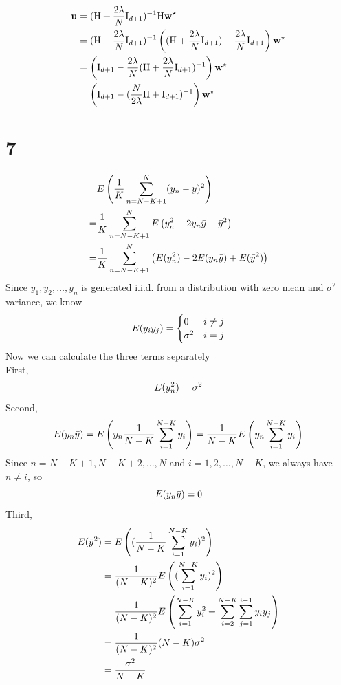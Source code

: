 \documentclass[11pt]{article}
\let\mathbb\relax
\theoremstyle{definition}
\begin{document}
\begin{align*}
  \vb{u} &= (\text{H} + \frac{2\lambda}{N}\text{I}_{d + 1})^{-1}\text{H}\vb{w}^\star \\ 
  &= (\text{H} + \frac{2\lambda}{N}\text{I}_{d + 1})^{-1}\left((\text{H} + \frac{2\lambda}{N}\text{I}_{d + 1}) - \frac{2\lambda}{N}\text{I}_{d + 1}\right)\vb{w}^\star \\
  &= \left(\text{I}_{d + 1} - \frac{2\lambda}{N}(\text{H} + \frac{2\lambda}{N}\text{I}_{d + 1})^{-1}\right) \vb{w}^\star \\
  &= \left(\text{I}_{d + 1} - (\frac{N}{2\lambda}\text{H} + \text{I}_{d + 1})^{-1}\right)\vb{w}^\star
\end{align*}
\newpage 
\section*{7}
\begin{align*}
  &\mathbb{E}\left(\frac{1}{K}\sum^N_{n = N - K + 1}(y_n - \bar{y})^2\right) \\ 
  =&\frac{1}{K}\sum^N_{n = N - K + 1}\mathbb{E}\left(y_n^2 - 2y_n\bar{y} + \bar{y}^2\right) \\  
  =&\frac{1}{K}\sum^N_{n = N - K + 1}\left(\mathbb{E}(y_n^2) - 2\mathbb{E}(y_n\bar{y}) + \mathbb{E}(\bar{y}^2)\right)
\end{align*}
Since $y_1, y_2,\dots,y_n$ is generated i.i.d. from a distribution with zero mean and $\sigma^2$ variance, we know
\[
  \mathbb{E}(y_iy_j) =
  \begin{cases}
    0 & i \neq j \\
    \sigma^2 & i = j
  \end{cases}
\]
Now we can calculate the three terms separately \\ 
First,
\begin{align*}
  \mathbb{E}(y^2_n) = \sigma^2
\end{align*}
Second,
\begin{align*}
  \mathbb{E}(y_n\bar{y}) = \mathbb{E}\left(y_n\frac{1}{N - K}\sum^{N - K}_{i = 1}y_i\right) = \frac{1}{N - K}\mathbb{E}\left(y_n\sum^{N - K}_{i = 1}y_i\right)
\end{align*}
Since $n = N - K + 1, N - K + 2,\dots, N$ and $i = 1, 2,\dots, N - K$, we always have $n \neq i$, so 
\[
  \mathbb{E}(y_n\bar{y}) = 0
\]
Third,
\begin{align*}
  \mathbb{E}(\bar{y}^2) &= \mathbb{E}\left((\frac{1}{N - K}\sum_{i = 1}^{N - K}y_i)^2\right) \\ 
  &= \frac{1}{(N - K)^2}\mathbb{E}\left((\sum_{i = 1}^{N - K}y_i)^2\right) \\ 
  &= \frac{1}{(N - K)^2}\mathbb{E}\left(\sum_{i = 1}^{N - K}y_i^2 + \sum_{i = 2}^{N - K}\sum_{j = 1}^{i - 1}y_iy_j\right) \\ 
  &= \frac{1}{(N - K)^2}(N - K)\sigma^2 \\ 
  &= \frac{\sigma^2}{N - K}
\end{align*}
\end{document}
